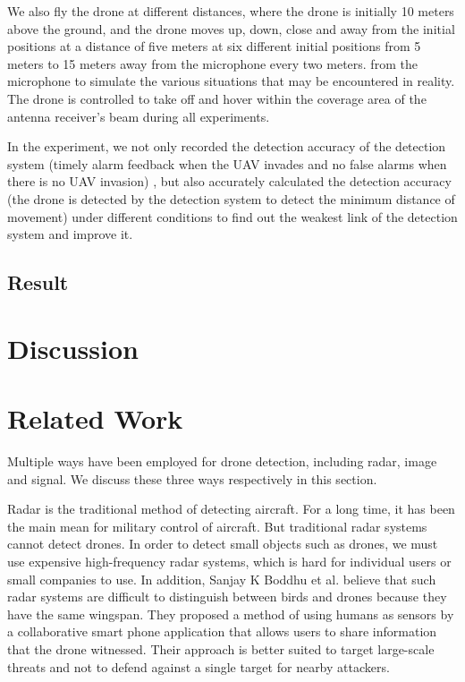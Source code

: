 \documentclass{sig-alternate-10pt}
\begin{document}
\hspace{1mm} 
We also fly the drone at different distances, where the drone is initially 10 meters above the ground, and the drone moves up, down, close and away from the initial positions at a distance of five meters at six different initial positions from 5 meters to 15 meters away from the microphone every two meters. from the microphone to simulate the various situations that may be encountered in reality. The drone is controlled to take off and hover within the coverage area of the antenna receiver’s beam during all experiments.

In the experiment, we not only recorded the detection accuracy of the detection system (timely alarm feedback when the UAV invades and no false alarms when there is no UAV invasion) , but also accurately calculated the detection accuracy (the drone is detected by the detection system to detect the minimum distance of movement) under different conditions to find out the weakest link of the detection system and improve it.



\subsection{Result}



\section{Discussion}



\section{Related Work}
Multiple ways have been employed for drone detection, including radar, image and signal. We discuss these three ways respectively in this section.

\hspace{1mm} 
Radar is the traditional method of detecting aircraft. For a long time, it has been the main mean for military control of aircraft. But traditional radar systems cannot detect drones. In order to detect small objects such as drones, we must use expensive high-frequency radar systems, which is hard for individual users or small companies to use. In addition, Sanjay K Boddhu et al. believe that such radar systems are difficult to distinguish between birds and drones because they have the same wingspan. They proposed a method of using humans as sensors by a collaborative smart phone application that allows users to share information that the drone witnessed. Their approach is better suited to target large-scale threats and not to defend against a single target for nearby attackers.
\end{document}
